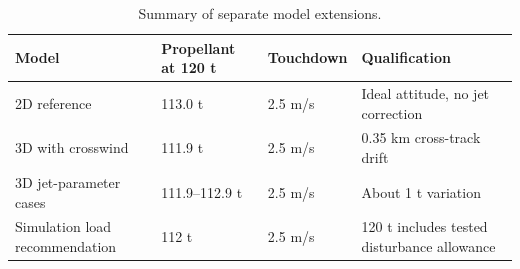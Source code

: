\begin{table}[htbp]
\caption{Summary of separate model extensions.}
\label{tab:src13}
\small
\setlength{\tabcolsep}{3.5pt}
\begin{tabularx}{\linewidth}{@{}XXXX@{}}
\toprule
Model & Propellant at 120 t & Touchdown & Qualification \\
\midrule
2D reference & 113.0 t & 2.5 m/s & Ideal attitude, no jet correction \\
3D with crosswind & 111.9 t & 2.5 m/s & 0.35 km cross-track drift \\
3D jet-parameter cases & 111.9--112.9 t & 2.5 m/s & About 1 t variation \\
Simulation load recommendation & 112 t & 2.5 m/s & 120 t includes tested disturbance allowance \\
\bottomrule
\end{tabularx}
\end{table}
